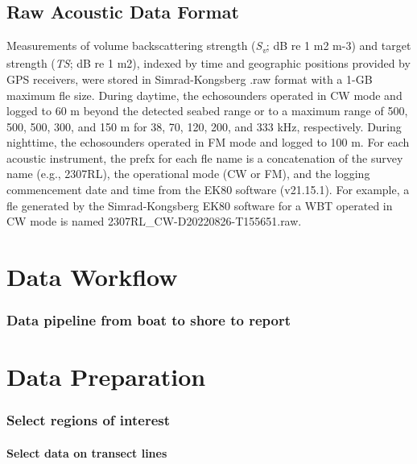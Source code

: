 \documentclass[
  letterpaper,
  oneside,
  open=any]{scrbook}
\begin{document}
\section{Raw Acoustic Data Format}\label{raw-acoustic-data-format}

Measurements of volume backscattering strength
(\emph{S\textsubscript{v}}; dB re 1 m2 m-3) and target strength
(\emph{TS}; dB re 1 m2), indexed by time and geographic positions
provided by GPS receivers, were stored in Simrad-Kongsberg .raw format
with a 1-GB maximum fle size. During daytime, the echosounders operated
in CW mode and logged to 60 m beyond the detected seabed range or to a
maximum range of 500, 500, 500, 300, and 150 m for 38, 70, 120, 200, and
333 kHz, respectively. During nighttime, the echosounders operated in FM
mode and logged to 100 m. For each acoustic instrument, the prefx for
each fle name is a concatenation of the survey name (e.g., 2307RL), the
operational mode (CW or FM), and the logging commencement date and time
from the EK80 software (v21.15.1). For example, a fle generated by the
Simrad-Kongsberg EK80 software for a WBT operated in CW mode is named
2307RL\_CW-D20220826-T155651.raw.


\chapter{Data Workflow}\label{data-workflow}

\subsection{Data pipeline from boat to shore to
report}\label{data-pipeline-from-boat-to-shore-to-report}


\chapter{Data Preparation}\label{data-preparation}

\subsection{Select regions of
interest}\label{select-regions-of-interest}

\subsubsection{Select data on transect
lines}\label{select-data-on-transect-lines}
\end{document}
